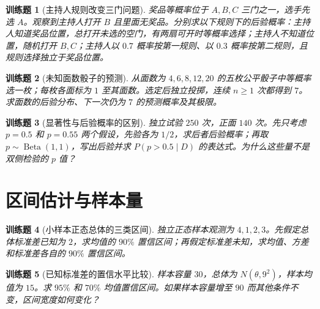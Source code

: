\documentclass[UTF8,12pt,a4paper,fontset=fandol]{ctexbook}
\newtheorem{exercise}{训练题}[section]
\begin{document}
\begin{exercise}[主持人规则改变三门问题]\label{q:M-P7-1}
奖品等概率位于 $A,B,C$ 三门之一，选手先选 $A$。观察到主持人打开 $B$ 且里面无奖品。分别求以下规则下的后验概率：主持人知道奖品位置，总打开未选的空门，有两扇可开时等概率选择；主持人不知道位置，随机打开 $B,C$；主持人以 $0.7$ 概率按第一规则、以 $0.3$ 概率按第二规则，且规则选择独立于奖品位置。\par{}\end{exercise}

\begin{exercise}[未知面数骰子的预测]\label{q:M-P7-2}
从面数为 $4,6,8,12,20$ 的五枚公平骰子中等概率选一枚；每枚各面标为 $1$ 至其面数。选定后独立投掷，连续 $n\ge1$ 次都得到 $7$。求面数的后验分布、下一次仍为 $7$ 的预测概率及其极限。\par{}\end{exercise}

\begin{exercise}[显著性与后验概率的区别]\label{q:M-P8-1fg}
独立试验 $250$ 次，正面 $140$ 次。先只考虑 $p=0.5$ 和 $p=0.55$ 两个假设，先验各为 $1/2$，求后者后验概率；再取 $p\sim\operatorname{Beta}(1,1)$，写出后验并求 $P(p>0.5\mid D)$ 的表达式。为什么这些量不是双侧检验的 $p$ 值？\par{}\end{exercise}

\clearpage\section{区间估计与样本量}

\begin{exercise}[小样本正态总体的三类区间]\label{q:M-C22-1}
独立正态样本观测为 $4,1,2,3$。先假定总体标准差已知为 $2$，求均值的 $90\%$ 置信区间；再假定标准差未知，求均值、方差和标准差各自的 $90\%$ 置信区间。\par{}\end{exercise}

\begin{exercise}[已知标准差的置信水平比较]\label{q:M-P10-1}
样本容量 $30$，总体为 $N(\theta,9^2)$，样本均值为 $15$。求 $95\%$ 和 $70\%$ 均值置信区间。如果样本容量增至 $90$ 而其他条件不变，区间宽度如何变化？\par{}\end{exercise}
\end{document}
